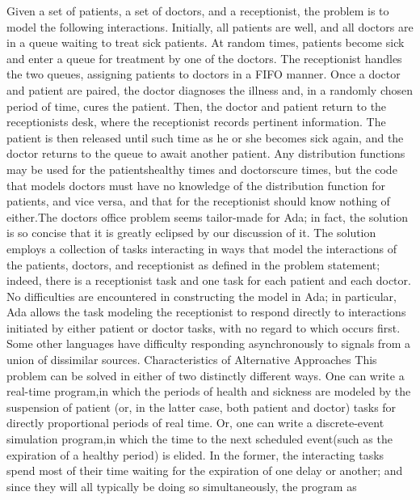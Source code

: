 \HdMjEndiii[]
\Para[]Given a set of patients, a set of doctors, and a receptionist,
the problem is to model the following interactions. Initially, all
patients are well, and all doctors are in a queue waiting to treat
sick patients. At random times, patients become sick and enter a queue
for treatment by one of the doctors. The receptionist handles the
two queues, assigning patients to doctors in a FIFO manner. Once a
doctor and patient are paired, the doctor diagnoses the illness and,
in a randomly chosen period of time, cures the patient. Then, the
doctor and patient return to the receptionist\rsquo[]s desk, where
the receptionist records pertinent information. The patient is then
released until such time as he or she becomes sick again, and the
doctor returns to the queue to await another patient. Any distribution
functions may be used for the patients\rsquo[] healthy times and doctors\rsquo[]
cure times, but the code that models doctors must have no knowledge
of the distribution function for patients, and vice versa, and that
for the receptionist should know nothing of either.\Endpara[]
\Para[]The doctor\rsquo[]s office problem seems tailor-made for Ada;
in fact, the solution is so concise that it is greatly eclipsed by
our discussion of it. The solution employs a collection of tasks interacting
in ways that model the interactions of the patients, doctors, and
receptionist as defined in the problem statement; indeed, there is
a receptionist task and one task for each patient and each doctor.
No difficulties are encountered in constructing the model in Ada;
in particular, Ada allows the task modeling the receptionist to respond
directly to interactions initiated by either patient or doctor tasks,
with no regard to which occurs first. Some other languages have difficulty
responding asynchronously to signals from a union of dissimilar sources.%
\Endpara[]
\DivLiv[]\HdMinLiv[]Characteristics of Alternative Approaches%
\HdMinEndiv[]
\Para[]This problem can be solved in either of two distinctly different
ways. One can write a \ldquo[]real-time program,\rdquo[] in which
the periods of health and sickness are modeled by the suspension of
patient (or, in the latter case, both patient and doctor) tasks for
directly proportional periods of real time. Or, one can write a \ldquo[]discrete-event
simulation program,\rdquo[] in which the time to the next scheduled
\ldquo[]event\rdquo[] (such as the expiration of a healthy period)
is elided. In the former, the interacting tasks spend most of their
time waiting for the expiration of one delay or another; and since
they will all typically be doing so simultaneously, the program as
